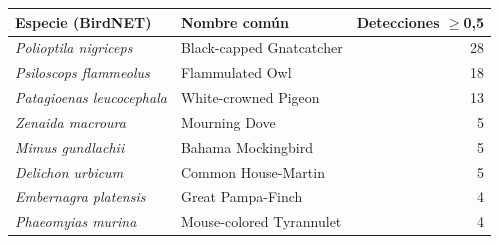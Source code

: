 \begin{tabular}{llr}
\toprule
Especie (BirdNET) & Nombre común & Detecciones $\geq$0,5\\
\midrule
\textit{Polioptila nigriceps} & Black-capped Gnatcatcher & 28\\
\textit{Psiloscops flammeolus} & Flammulated Owl & 18\\
\textit{Patagioenas leucocephala} & White-crowned Pigeon & 13\\
\textit{Zenaida macroura} & Mourning Dove & 5\\
\textit{Mimus gundlachii} & Bahama Mockingbird & 5\\
\textit{Delichon urbicum} & Common House-Martin & 5\\
\textit{Embernagra platensis} & Great Pampa-Finch & 4\\
\textit{Phaeomyias murina} & Mouse-colored Tyrannulet & 4\\
\bottomrule
\end{tabular}
